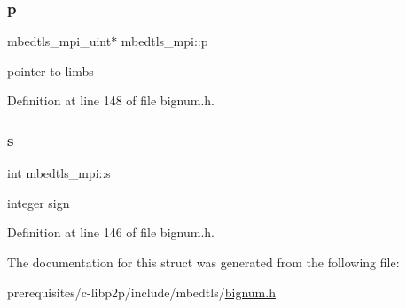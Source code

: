 \mbox{\label{structmbedtls__mpi_af0af10ca10e97e8bce41da588600836e}} 
\subsubsection{\texorpdfstring{p}{p}}
{\footnotesize\ttfamily mbedtls\+\_\+mpi\+\_\+uint$\ast$ mbedtls\+\_\+mpi\+::p}

pointer to limbs 

Definition at line 148 of file bignum.\+h.

\mbox{\label{structmbedtls__mpi_a98e0b295f053643085b1c756857c3477}} 
\subsubsection{\texorpdfstring{s}{s}}
{\footnotesize\ttfamily int mbedtls\+\_\+mpi\+::s}

integer sign 

Definition at line 146 of file bignum.\+h.



The documentation for this struct was generated from the following file\+:\begin{DoxyCompactItemize}
\item 
prerequisites/c-\/libp2p/include/mbedtls/\mbox{\hyperlink{bignum_8h}{bignum.\+h}}\end{DoxyCompactItemize}
